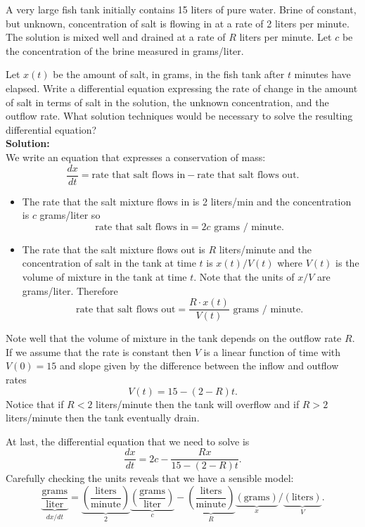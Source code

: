 \begin{example}
    A very large fish tank initially contains 15 liters of pure water.  Brine of constant,
    but unknown, concentration of salt is flowing in at a rate of 2 liters per minute.
    The solution is mixed well and drained at a rate of $R$ liters per minute.  Let $c$ be
    the concentration of the brine measured in grams/liter.

    Let $x(t)$ be the amount of salt, in grams, in the fish tank after $t$ minutes have
    elapsed.  Write a differential equation expressing the rate of change in the amount of
    salt in terms of salt in the solution, the unknown concentration, and the outflow
    rate.  What solution techniques would be necessary to solve the resulting differential
    equation?
    \\{\bf Solution:} \\
    We write an equation that expresses a conservation of mass:
    \[ \frac{dx}{dt} = \text{rate that salt flows in} - \text{rate that salt flows out}.
    \]
    \begin{itemize}
        \item The rate that the salt mixture flows in is 2 liters/min and the concentration is
            $c$ grams/liter so
            \[ \text{rate that salt flows in} = 2c \text{ grams / minute. } \]
        \item The rate that the salt mixture flows out is $R$ liters/minute and the concentration
            of salt in the tank at time $t$ is $x(t)/V(t)$ where $V(t)$ is the volume of
            mixture in
            the tank at time $t$.  Note that the units of $x/V$ are grams/liter. Therefore
            \[ \text{rate that salt flows out} = \frac{R \cdot x(t)}{V(t)} \text{ grams /
            minute. } \]
    \end{itemize}
    Note well that the volume of mixture in the tank depends on the outflow rate $R$.  If
    we assume that the rate is constant then $V$ is a linear function of time with $V(0) =
    15$ and slope given by the difference between the inflow and outflow rates
    \[ V(t) = 15 - (2-R)t. \]
    Notice that if $R<2$ liters/minute then the tank will overflow and if $R>2$
    liters/minute then the tank eventually drain.
    
    At last, the differential equation that we need to solve is
    \[ \frac{dx}{dt} = 2c - \frac{Rx}{15-(2-R)t}. \]
    Carefully checking the units reveals that we have a sensible model:
    \[ \underbrace{\frac{\text{grams}}{\text{liter}}}_{dx/dt} = \underbrace{\left( \frac{\text{liters}}{\text{minute}}
    \right)}_{2} \underbrace{\left( \frac{\text{grams}}{\text{liter}} \right)}_{c} -
\underbrace{\left( \frac{\text{liters}}{\text{minute}} \right)}_{R} \underbrace{\left(
\text{grams} \right)}_{x} \Big/ \underbrace{\left( \text{liters} \right)}_{V}. \]


\end{example}
